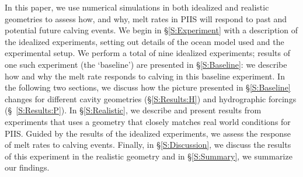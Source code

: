 \documentclass[draft]{agujournal2019}
\begin{document}
In this paper, we use numerical simulations in both idealized and realistic geometries to assess how, and why, melt rates in PIIS will respond to past and potential future calving events. We begin in \S\ref{S:Experiment} with a description of the idealized experiments, setting out details of the ocean model used and the experimental setup. We perform a total of nine idealized experiments; results of one such experiment (the `baseline') are presented in \S\ref{S:Baseline}: we describe how and why the melt rate responds to calving in this baseline experiment. In the following two sections, we discuss how the picture presented in \S\ref{S:Baseline} changes for different cavity geometries (\S\ref{S:Results:H}) and hydrographic forcings (\S~\ref{S:Results:P}). In \S\ref{S:Realistic}, we describe and present results from experiments that uses a geometry that closely matches real world conditions for PIIS. Guided by the results of the idealized experiments, we assess the response of melt rates to calving events. Finally, in \S\ref{S:Discussion}, we discuss the results of this experiment in the realistic geometry and in \S\ref{S:Summary}, we summarize our findings.





\end{document}
